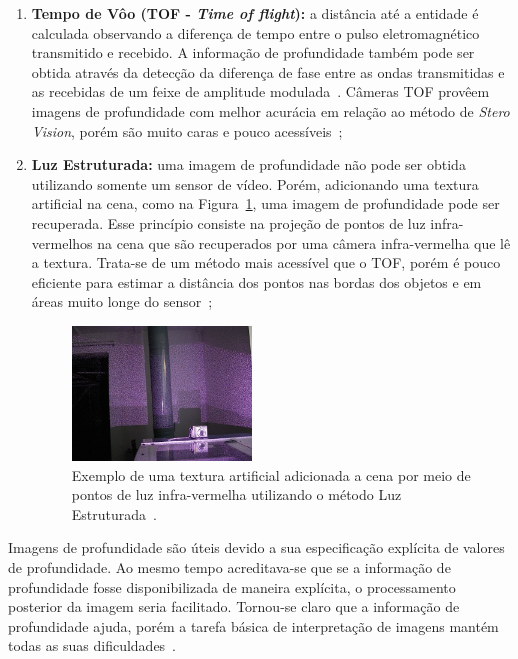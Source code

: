\begin{enumerate}
		\item \textbf{Tempo de Vôo (TOF - \textit{Time of flight}):} a distância até a
		entidade é calculada observando a diferença de tempo entre o pulso
		eletromagnético transmitido e recebido. A informação de profundidade também pode
		ser obtida através da detecção da diferença de fase entre as ondas transmitidas
		e as recebidas de um feixe de amplitude modulada~\cite{jain, fall-detection}.
		Câmeras TOF provêem imagens de profundidade com melhor acurácia em relação ao
		método de \textit{Stero Vision}, porém são muito caras e pouco
		acessíveis~\cite{fall-detection};
		
		\item \textbf{Luz Estruturada:} uma imagem de
		profundidade não pode ser obtida utilizando somente um sensor de vídeo. Porém,
		adicionando uma textura artificial na cena, como na
		Figura~\ref{fig:structured-light}, uma imagem de profundidade pode ser
		recuperada. Esse princípio consiste na projeção de pontos de luz infra-vermelhos
		na cena que são recuperados por uma câmera infra-vermelha que lê a textura.
		Trata-se de um método mais acessível que o TOF, porém é pouco eficiente
		para estimar a distância dos pontos nas bordas dos objetos e em áreas muito
		longe do sensor~\cite{fall-detection};
		
		\begin{figure}[htb]
			\begin{center}
				\includegraphics[width=0.45\textwidth]{figuras/2.FundamentacaoTeorica/structured-light.jpg}
			\end{center}
			\caption{Exemplo de uma textura artificial adicionada a cena por meio de
			pontos de luz infra-vermelha utilizando o método Luz Estruturada~\cite{img-strutuctured-light}.}
			\label{fig:structured-light}
		\end{figure}
	\end{enumerate}

	Imagens de profundidade são úteis devido a sua especificação explícita de
	valores de profundidade. Ao mesmo tempo acreditava-se que se a informação de
	profundidade fosse disponibilizada de maneira explícita, o processamento
	posterior da imagem seria facilitado. Tornou-se claro que a informação de
	profundidade ajuda, porém a tarefa básica de interpretação de imagens mantém
	todas as suas dificuldades~\cite{jain}.

